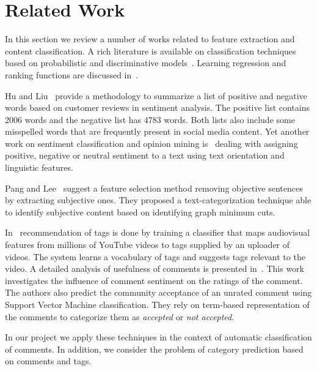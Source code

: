 \section{Related Work}
\label{sec:rel}
In this section we review a number of works related to feature extraction and content classification.
A rich literature is available on classification techniques based on probabilistic and discriminative models~\cite{Chakrabarti}.
Learning regression and ranking functions are discussed in~\cite{Smola}.

Hu and Liu~\cite{HuM} provide a methodology to summarize a list of positive and negative words based on customer reviews in sentiment analysis.
The positive list contains $2006$ words and the negative list has $4783$ words. Both lists also include some misspelled words that are frequently present in social media content.
Yet another work on sentiment classification and opinion mining is~\cite{thumbsup} dealing with assigning positive, negative or neutral sentiment to a text using text orientation and linguistic features.

Pang and Lee~\cite{PangLee} suggest a feature selection method removing objective sentences by extracting subjective ones.
They proposed a text-categorization technique able to identify subjective content based on identifying graph minimum cuts.

In~\cite{ tagRecCatDis} recommendation of tags is done by training a classifier that maps audiovisual features from millions of YouTube videos to tags supplied by an uploader of videos. The system learns a vocabulary of tags and suggests tags relevant to the video.
A detailed analysis of usefulness of comments is presented in~\cite{Siersdorfer:2010:UYC:1772690.1772781}. This work investigates the influence of comment sentiment on the ratings of the comment. The authors also predict the community acceptance of an unrated comment using Support Vector Machine classification. They rely on term-based representation of the comments to categorize them as \textit{accepted} or \textit{not accepted}.

In our project we apply these techniques in the context of automatic classification of comments.
In addition, we consider the problem of category prediction based on comments and tags.
